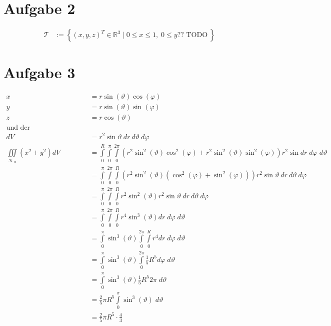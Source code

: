 \documentclass[10pt,a4paper,parskip=half]{scrartcl}
\newcommand{\R}{\mathbb{R}}
\begin{document}
\section*{Aufgabe 2}
\begin{align*}
\mathcal{T} &:= \left\lbrace (x,y,z)^T \in \R^3 \mid 0\leq x \leq 1, \; 0\leq y \text{?? TODO}\ \right\rbrace
\end{align*}
\section*{Aufgabe 3}
\begin{align*}
x &= r \sin( \vartheta ) \cos(\varphi) \\
y &= r \sin(\vartheta) \sin(\varphi)\\
z &= r \cos( \vartheta)\\
\text{und der Funktionaldeterminanten} \\
dV &= r^2 \sin \vartheta~ dr ~d\vartheta ~d\varphi \\
\iiint\limits_{\mathcal{K}_R} \left( x^2 + y^2 \right) dV &= \int\limits_{0}^{R}\int\limits_{0}^{\pi} \int\limits_{0}^{2\pi} \left( r^2\sin^2(\vartheta)\cos^2(\varphi) + r^2\sin^2(\vartheta)\sin^2(\varphi) \right) r^2 \sin dr \; d\varphi \; d\vartheta\\ 
&= \int\limits_{0}^{\pi} \int\limits_{0}^{2\pi}\int\limits_{0}^{R} \left( r^2\sin^2(\vartheta) \left( \cos^2(\varphi) + \sin^2(\varphi) \right) \right)  r^2 \sin \vartheta~ dr ~d\vartheta ~d\varphi\\
&= \int\limits_{0}^{\pi} \int\limits_{0}^{2\pi}\int\limits_{0}^{R}  r^2\sin^2(\vartheta)  r^2 \sin \vartheta~ dr ~d\vartheta ~d\varphi\\
&= \int\limits_{0}^{\pi} \int\limits_{0}^{2\pi}\int\limits_{0}^{R}  r^4\sin^3(\vartheta) dr \; d\varphi \; d\vartheta\\
&= \int\limits_{0}^{\pi} \sin^3(\vartheta) \int\limits_{0}^{2\pi}\int\limits_{0}^{R} r^4 dr \; d\varphi \; d\vartheta\\
&= \int\limits_{0}^{\pi} \sin^3(\vartheta)  \int\limits_{0}^{2\pi} \frac 15 R^5 d\varphi \; d\vartheta\\
&= \int\limits_{0}^{\pi} \sin^3(\vartheta)\frac 15 R^5 2\pi \; d\vartheta\\
&= \frac 25 \pi R^5 \int\limits_0^{\pi} \sin^3(\vartheta) \; d\vartheta\\
&= \frac 25 \pi R^5 \cdot \frac 43
\end{align*}
\end{document}
